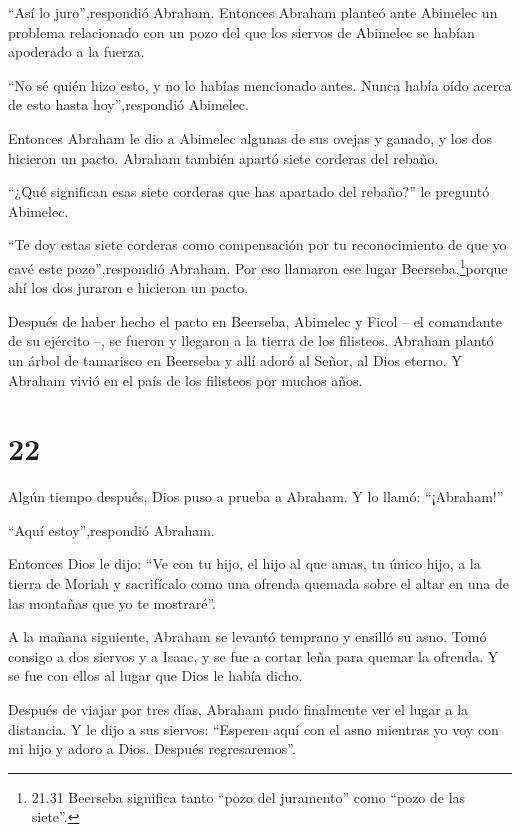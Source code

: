  ``Así lo juro'',respondió Abraham.  Entonces
Abraham planteó ante Abimelec un problema relacionado con un pozo del
que los siervos de Abimelec se habían apoderado a la fuerza.

 ``No sé quién hizo esto, y no lo habías mencionado antes.
Nunca había oído acerca de esto hasta hoy'',respondió Abimelec.

 Entonces Abraham le dio a Abimelec algunas de sus ovejas y
ganado, y los dos hicieron un pacto.  Abraham también
apartó siete corderas del rebaño.

 ``¿Qué significan esas siete corderas que has apartado del
rebaño?'' le preguntó Abimelec.

 ``Te doy estas siete corderas como compensación por tu
reconocimiento de que yo cavé este pozo'',respondió Abraham.
 Por eso llamaron ese lugar Beerseba,\footnote{21.31
  Beerseba significa tanto ``pozo del juramento'' como ``pozo de las
  siete''.}porque ahí los dos juraron e hicieron un pacto.

 Después de haber hecho el pacto en Beerseba, Abimelec y
Ficol -- el comandante de su ejército --, se fueron y llegaron a la
tierra de los filisteos.  Abraham plantó un árbol de
tamarisco en Beerseba y allí adoró al Señor, al Dios eterno.
 Y Abraham vivió en el país de los filisteos por muchos
años.

\hypertarget{section-21}{%
\section{22}\label{section-21}}

 Algún tiempo después, Dios puso a prueba a Abraham. Y lo
llamó: ``¡Abraham!''

``Aquí estoy'',respondió Abraham.

 Entonces Dios le dijo: ``Ve con tu hijo, el hijo al que
amas, tu único hijo, a la tierra de Moriah y sacrifícalo como una
ofrenda quemada sobre el altar en una de las montañas que yo te
mostraré''.

 A la mañana siguiente, Abraham se levantó temprano y
ensilló su asno. Tomó consigo a dos siervos y a Isaac, y se fue a cortar
leña para quemar la ofrenda. Y se fue con ellos al lugar que Dios le
había dicho.

 Después de viajar por tres días, Abraham pudo finalmente
ver el lugar a la distancia.  Y le dijo a sus siervos:
``Esperen aquí con el asno mientras yo voy con mi hijo y adoro a Dios.
Después regresaremos''.

